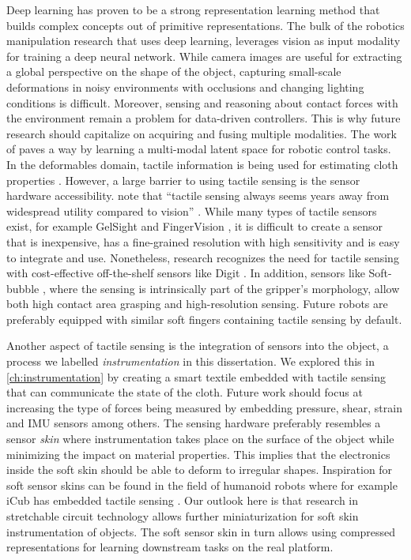 \documentclass[\home/main.tex]{subfiles}
\begin{document}

Deep learning has proven to be a strong representation learning method that builds complex concepts out of primitive representations. The bulk of the robotics manipulation research that uses deep learning, leverages vision as input modality for training a deep neural network. While camera images are useful for extracting a global perspective on the shape of the object, capturing small-scale deformations in noisy environments with occlusions and changing lighting conditions is difficult. Moreover, sensing and reasoning about contact forces with the environment remain a problem for data-driven controllers. This is why future research should capitalize on acquiring and fusing multiple modalities. The work of \autocite{lee2020making} paves a way by learning a multi-modal latent space for robotic control tasks. In the deformables domain, tactile information is being used for estimating cloth properties \autocite{yuan2018active}. However, a large barrier to using tactile sensing is the sensor hardware accessibility. \citeauthor{Siciliano2008} note that \enquote{tactile sensing always seems years away from widespread utility compared to vision} \autocite{Siciliano2008}. While many types of tactile sensors exist, for example GelSight \autocite{donlon2018gelslim} and FingerVision \autocite{Yamaguchi2017}, it is difficult to create a sensor that is inexpensive, has a fine-grained resolution with high sensitivity and is easy to integrate and use. Nonetheless, research recognizes the need for tactile sensing with cost-effective off-the-shelf sensors like Digit \autocite{digit2020}. In addition, sensors like Soft-bubble \autocite{Alspach2019}, where the sensing is intrinsically part of the gripper's morphology, allow both high contact area grasping and high-resolution sensing. Future robots are preferably equipped with similar soft fingers containing tactile sensing by default. 

Another aspect of tactile sensing is the integration of sensors into the object, a process we labelled \textit{instrumentation} in this dissertation. 
We explored this in \cref{ch:instrumentation} by creating a smart textile embedded with tactile sensing that can communicate the state of the cloth. Future work should focus at increasing the type of forces being measured by embedding pressure, shear, strain and IMU sensors among others. The sensing hardware preferably resembles a sensor \emph{skin} where instrumentation takes place on the surface of the object while minimizing the impact on material properties. This implies that the electronics inside the soft skin should be able to deform to irregular shapes. Inspiration for soft sensor skins can be found in the field of humanoid robots where for example iCub has embedded tactile sensing \autocite{Tomo2018}. Our outlook here is that research in stretchable circuit technology allows further miniaturization for soft skin instrumentation of objects. The soft sensor skin in turn allows using compressed representations for learning downstream tasks on the real platform. 
\end{document}
